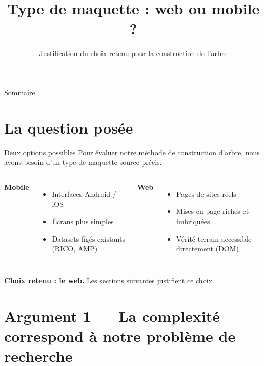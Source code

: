 \documentclass[11pt]{beamer}
\title{Type de maquette : web ou mobile ?}
\subtitle{Justification du choix retenu pour la construction de l'arbre}
\date{}
\author{}
\begin{document}
\maketitle

\begin{frame}{Sommaire}
  \tableofcontents
\end{frame}

\section{La question posée}

\begin{frame}{Deux options possibles}
  Pour évaluer notre méthode de construction d'arbre, nous avons besoin
  d'un type de maquette source précis.

  \vspace{1em}

  \begin{columns}
    \textbf{Mobile}
    \begin{itemize}
      \item Interfaces Android / iOS
      \item Écrans plus simples
      \item Datasets figés existants (RICO, AMP)
    \end{itemize}

    \textbf{Web}
    \begin{itemize}
      \item Pages de sites réels
      \item Mises en page riches et imbriquées
      \item Vérité terrain accessible directement (DOM)
    \end{itemize}
  \end{columns}

  \vspace{1em}
  \textbf{Choix retenu : le web.} Les sections suivantes justifient ce choix.
\end{frame}

\section{Argument 1 --- La complexité correspond à notre problème de recherche}
\end{document}
